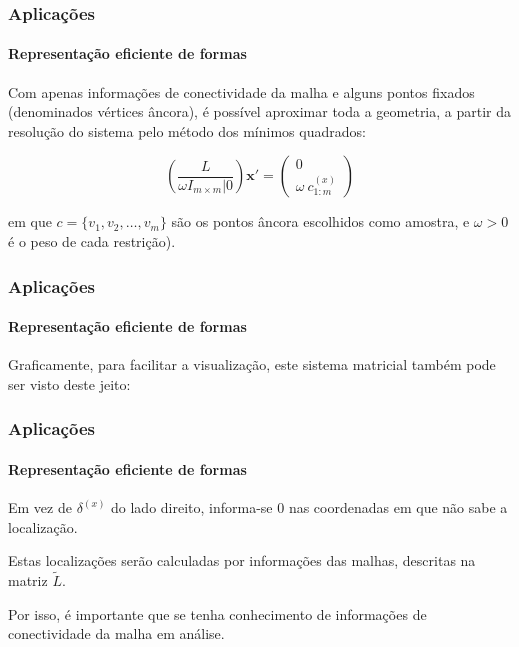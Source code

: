 \begin{frame}
\frametitle{Aplicações}
\framesubtitle{Representação eficiente de formas}

Com apenas informações de conectividade da malha e alguns pontos fixados (denominados vértices âncora), é possível aproximar toda a geometria, a partir da resolução do sistema pelo método dos mínimos quadrados:

\begin{equation}\label{eq:sisrecover}
	\left( \frac{L}{\omega I_{m \times m} | 0} \right) \mathbf{x'} = \begin{pmatrix}
		0\\
		\omega\ c_{1:m}^{(x)}
	\end{pmatrix}
\end{equation}

em que $c = \{v_1, v_2, \dots, v_m\}$ são os pontos âncora escolhidos como amostra, e $\omega > 0$ é o peso de cada restrição).

\end{frame}

\begin{frame}
\frametitle{Aplicações}
\framesubtitle{Representação eficiente de formas}

Graficamente, para facilitar a visualização, este sistema matricial também pode ser visto deste jeito:

\begin{center}
\end{center}

\end{frame}


\begin{frame}
\frametitle{Aplicações}
\framesubtitle{Representação eficiente de formas}

Em vez de $\delta^{(x)}$ do lado direito, informa-se $0$ nas coordenadas em que não sabe a localização.

\medskip

Estas localizações serão calculadas por informações das malhas, descritas na matriz $\tilde{L}$.

\medskip

Por isso, é importante que se tenha conhecimento de informações de conectividade da malha em análise.
\end{frame}
